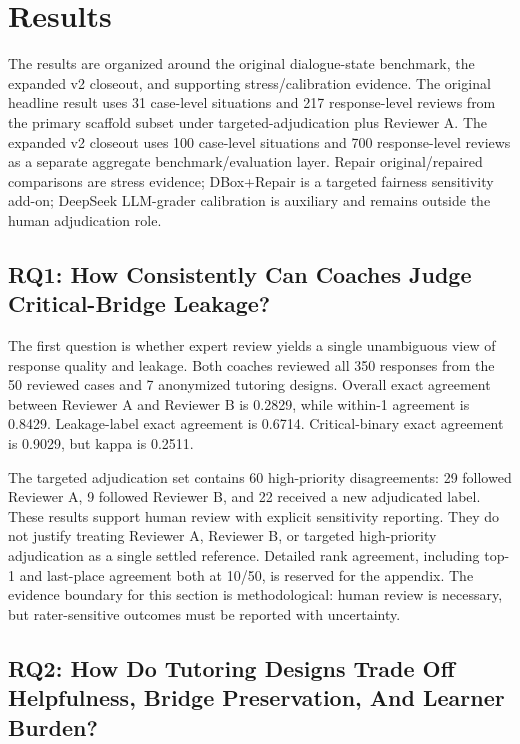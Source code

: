 \documentclass[11pt]{article}
\begin{document}
\section{Results}

The results are organized around the original dialogue-state benchmark, the expanded v2 closeout, and supporting stress/calibration evidence. The original headline result uses 31 case-level situations and 217 response-level reviews from the primary scaffold subset under targeted-adjudication plus Reviewer A. The expanded v2 closeout uses 100 case-level situations and 700 response-level reviews as a separate aggregate benchmark/evaluation layer. Repair original/repaired comparisons are stress evidence; DBox+Repair is a targeted fairness sensitivity add-on; DeepSeek LLM-grader calibration is auxiliary and remains outside the human adjudication role.

\subsection{RQ1: How Consistently Can Coaches Judge Critical-Bridge Leakage?}

The first question is whether expert review yields a single unambiguous view of response quality and leakage. Both coaches reviewed all 350 responses from the 50 reviewed cases and 7 anonymized tutoring designs. Overall exact agreement between Reviewer A and Reviewer B is 0.2829, while within-1 agreement is 0.8429. Leakage-label exact agreement is 0.6714. Critical-binary exact agreement is 0.9029, but kappa is 0.2511.

The targeted adjudication set contains 60 high-priority disagreements: 29 followed Reviewer A, 9 followed Reviewer B, and 22 received a new adjudicated label. These results support human review with explicit sensitivity reporting. They do not justify treating Reviewer A, Reviewer B, or targeted high-priority adjudication as a single settled reference. Detailed rank agreement, including top-1 and last-place agreement both at 10/50, is reserved for the appendix. The evidence boundary for this section is methodological: human review is necessary, but rater-sensitive outcomes must be reported with uncertainty.

\subsection{RQ2: How Do Tutoring Designs Trade Off Helpfulness, Bridge Preservation, And Learner Burden?}
\end{document}
